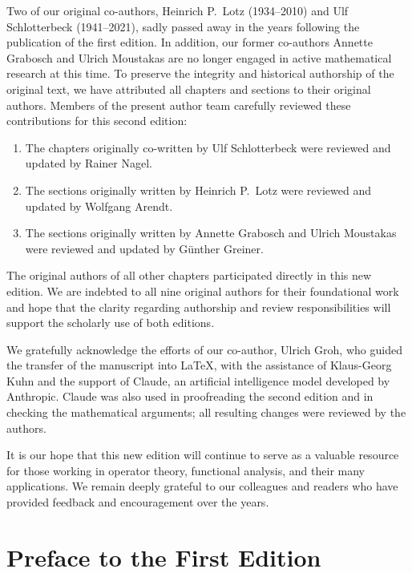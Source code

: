 Two of our original co-authors, Heinrich P.~Lotz (1934--2010) and Ulf Schlotterbeck (1941--2021), sadly passed away in the years following the publication of the first edition. 
In addition, our former co-authors Annette Grabosch and Ulrich Moustakas are no longer engaged in active mathematical research at this time. 
To preserve the integrity and historical authorship of the original text, we have attributed all chapters and sections to their original authors.
Members of the present author team carefully reviewed these contributions for this second edition:
\begin{enumerate}[$\bullet$, wide, labelindent=.25em,itemsep=.25em]
\item 
The chapters originally co-written by Ulf Schlotterbeck were reviewed and updated by Rainer Nagel.

\item 
The sections originally written by Heinrich P.~Lotz were reviewed and updated by Wolfgang Arendt.

\item 
The sections originally written by Annette Grabosch and Ulrich Moustakas were reviewed and updated by G\"unther Greiner.

\end{enumerate}
The original authors of all other chapters participated directly in this new edition. 
We are indebted to all nine original authors for their foundational work and hope that the clarity regarding authorship and review responsibilities will support the scholarly use of both editions.

We gratefully acknowledge the efforts of our co-author, Ulrich Groh, who guided the transfer of the manuscript into \LaTeX{}, with the assistance of Klaus-Georg Kuhn and the support of Claude, an artificial intelligence model developed by Anthropic.
Claude was also used in proofreading the second edition and in checking the mathematical arguments; all resulting changes were reviewed by the authors.



It is our hope that this new edition will continue to serve as a valuable resource for those working in operator theory, functional analysis, and their many applications. We remain deeply grateful to our colleagues and readers who have provided feedback and encouragement over the years.

\section*{Preface to the First Edition}
 
